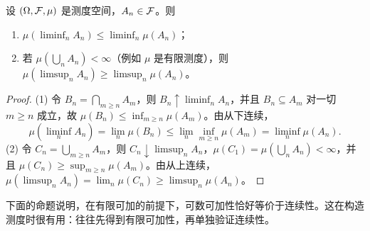 \begin{proposition}\label{prop:measures:fatou-sets}
设 $(\Omega,\mathcal{F},\mu)$ 是测度空间，$A_n\in\mathcal{F}$。则
\begin{enumerate}
\item $\mu(\liminf_nA_n)\leqslant\liminf_n\mu(A_n)$；
\item 若 $\mu(\bigcup_nA_n)<\infty$（例如 $\mu$ 是有限测度），则 $\mu(\limsup_nA_n)\geqslant\limsup_n\mu(A_n)$。
\end{enumerate}
\end{proposition}
\begin{proof}
(1) 令 $B_n=\bigcap_{m\geqslant n}A_m$，则 $B_n\uparrow\liminf_nA_n$，并且 $B_n\subseteq A_m$ 对一切 $m\geqslant n$ 成立，故 $\mu(B_n)\leqslant\inf_{m\geqslant n}\mu(A_m)$。由从下连续，
\[
\mu(\liminf_nA_n)=\lim_n\mu(B_n)\leqslant\lim_n\inf_{m\geqslant n}\mu(A_m)=\liminf_n\mu(A_n).
\]
(2) 令 $C_n=\bigcup_{m\geqslant n}A_m$，则 $C_n\downarrow\limsup_nA_n$，$\mu(C_1)=\mu(\bigcup_nA_n)<\infty$，并且 $\mu(C_n)\geqslant\sup_{m\geqslant n}\mu(A_m)$。由从上连续，$\mu(\limsup_nA_n)=\lim_n\mu(C_n)\geqslant\limsup_n\mu(A_n)$。
\end{proof}

下面的命题说明，在有限可加的前提下，可数可加性恰好等价于连续性。这在构造测度时很有用：往往先得到有限可加性，再单独验证连续性。


